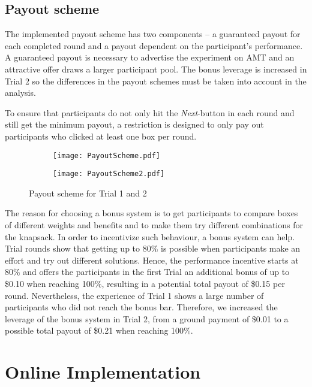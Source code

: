 \subsection{Payout scheme}
\label{ch:Experiment:sec:Interface:subsec:Payout scheme}
The implemented payout scheme has two components – a guaranteed payout for each completed round and a payout dependent on the participant’s performance. A guaranteed payout is necessary to advertise the experiment on \ac{AMT} and an attractive offer draws a larger participant pool. The bonus leverage is increased in Trial 2 so the differences in the payout schemes must be taken into account in the analysis.

To ensure that participants do not only hit the \textit{Next}-button in each round and still get the minimum payout, a restriction is designed to only pay out participants who clicked at least one box per round.
 \begin{figure}[htp] %
\begin{center}
\begin{subfigure} 
\centering
\texttt{[image: PayoutScheme.pdf]}
\end{subfigure}
\begin{subfigure} 
\centering
\texttt{[image: PayoutScheme2.pdf]}
\end{subfigure}
\caption{Payout scheme for Trial 1 and 2}
\label{fig:PayoutScheme}
\end{center}
\end{figure} 

The reason for choosing a bonus system is to get participants to compare boxes of different weights and benefits and to make  them try different combinations for the knapsack.
In order to incentivize such behaviour, a bonus system can help. Trial rounds show that getting up to 80\% is possible when participants make an effort and try out different solutions. Hence, the performance incentive starts at 80\% and offers the participants in the first Trial an additional bonus of up to \$0.10 when reaching 100\%, resulting in a potential total payout of \$0.15 per round. Nevertheless, the experience of Trial 1 shows a large number of participants who did not reach the bonus bar. Therefore, we increased the leverage of the bonus system in Trial 2, from a ground payment of \$0.01 to a possible total payout of \$0.21 when reaching 100\%.

\section{Online Implementation}
\label{ch:Experiment:sec:OnlineImplementation}

